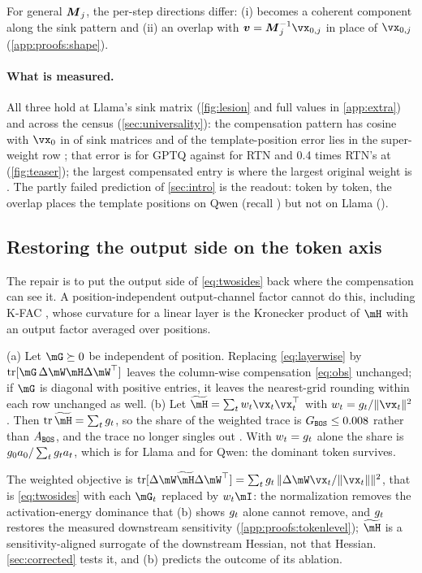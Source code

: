 For general $\boldsymbol{M}_j$, the per-step directions differ: (i) becomes a coherent
component along the sink pattern and (ii) an overlap with
$\vv=\mM_j^{-1}\vx_{0,j}$ in place of $\vx_{0,j}$ (\cref{app:proofs:shape}).

\paragraph{What is measured.}
All three hold at Llama's sink matrix (\cref{fig:lesion} and full values in \cref{app:extra}) and across the census (\cref{sec:universality}): the compensation pattern has cosine \PatCosBos{} with $\vx_0$ in \nPatHit{} of \nPatAll{} sink matrices and \LrowShare{} of the template-position error lies in the super-weight row \citep{yu2024superweight}; that error is \LtplErrGPTQ{} for GPTQ against \LtplErrRTN{} for RTN and 0.4 times RTN's at \bos{} (\cref{fig:teaser}); the largest compensated entry is \LmaxQ{} where the largest original weight is \LmaxW{}.
The partly failed prediction of \cref{sec:intro} is the readout: token by token, the overlap places the template positions on Qwen (recall \IsoRecall{}) but not on Llama (\LIsoRecall{}).


\subsection{Restoring the output side on the token axis}
\label{sec:mechanism:restore}
The repair is to put the output side of \cref{eq:twosides} back where the compensation can see it. A position-independent output-channel factor cannot do this, including K-FAC \citep{martens2015kfac}, whose curvature for a linear layer is the Kronecker product of $\hess$ with an output factor averaged over positions.
\begin{proposition}
\label{prop:tokenlevel}
(a) Let $\mG\succeq0$ be independent of position.
Replacing \cref{eq:layerwise} by $\operatorname{tr}[\mG\,\Delta\mW\hess\Delta\mW^\top]$ leaves the column-wise compensation \cref{eq:obs} unchanged; if $\mG$ is diagonal with positive entries, it leaves the nearest-grid rounding within each row unchanged as well.
(b) Let $\hessw=\sum_t\wtok\vx_t\vx_t^\top$ with $\wtok=\gsens/\|\vx_t\|^2$.
Then $\operatorname{tr}\hessw=\sum_t\gsens$, so the \bos{} share of the weighted trace is $G_{\texttt{BOS}}\le0.008{}$ rather than $A_{\texttt{BOS}}$, and the trace no longer singles out \bos{}.
With $w_t=g_t$ alone the share is $g_0a_0/\sum_tg_t a_t$, which is \AGbosL{} for Llama and \AGbosQ{} for Qwen: the dominant token survives.
\end{proposition}
The weighted objective is $\operatorname{tr}[\Delta\mW\hessw\Delta\mW^\top]=\sum_t\gsens\,\|\Delta\mW\vx_t/\|\vx_t\|\|^2$, that is \cref{eq:twosides} with each $\mG_t$ replaced by $\wtok\mI$: the normalization removes the activation-energy dominance that (b) shows $g_t$ alone cannot remove, and $g_t$ restores the measured downstream sensitivity (\cref{app:proofs:tokenlevel}); $\hessw$ is a sensitivity-aligned surrogate of the downstream Hessian, not that Hessian.
\cref{sec:corrected} tests it, and (b) predicts the outcome of its ablation.

